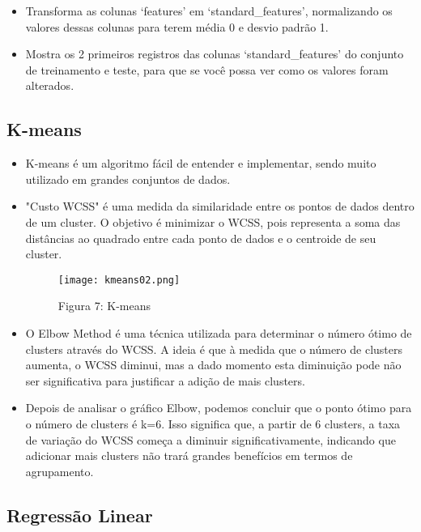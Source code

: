 \documentclass[11pt]{article}
\providecommand{\tightlist}{%
      \setlength{\itemsep}{0pt}\setlength{\parskip}{0pt}}
\begin{document}
    \begin{itemize}
\tightlist
\item
  Transforma as colunas `features' em `standard\_features', normalizando
  os valores dessas colunas para terem média 0 e desvio padrão 1.
\item
  Mostra os 2 primeiros registros das colunas `standard\_features' do
  conjunto de treinamento e teste, para que se você possa ver como os
  valores foram alterados.
\end{itemize}

    \hypertarget{k-means}{%
\subsection{K-means}\label{K-means}}
    \begin{itemize}
\tightlist
\item
K-means é um algoritmo fácil de entender e implementar, sendo muito utilizado em grandes conjuntos de dados.
\item
"Custo WCSS" é uma medida da similaridade entre os pontos de dados dentro de um cluster.
O objetivo é minimizar o WCSS, pois representa a soma das distâncias ao quadrado entre cada ponto de dados e o centroide de seu cluster.

\begin{figure}[h]
   \centering
   \texttt{[image: kmeans02.png]}
   \pagebreak
    \caption{Figura 7: K-means}
    \pagebreak
   \label{fig:kmeans02}
\end{figure}

\pagebreak
\item
O Elbow Method é uma técnica utilizada para determinar o número ótimo de clusters através do WCSS.
A ideia é que à medida que o número de clusters aumenta, o WCSS diminui, mas a dado momento esta diminuição pode não ser significativa para justificar a adição de mais clusters.
\item
Depois de analisar o gráfico Elbow, podemos concluir que o ponto ótimo para o número de clusters é k=6.
Isso significa que, a partir de 6 clusters, a taxa de variação do WCSS começa a diminuir significativamente, indicando que adicionar mais clusters não trará grandes benefícios em termos de agrupamento.
\end{itemize}


    \hypertarget{regressuxe3o-linear}{%
\subsection{Regressão Linear}\label{regressuxe3o-linear}}
\end{document}
